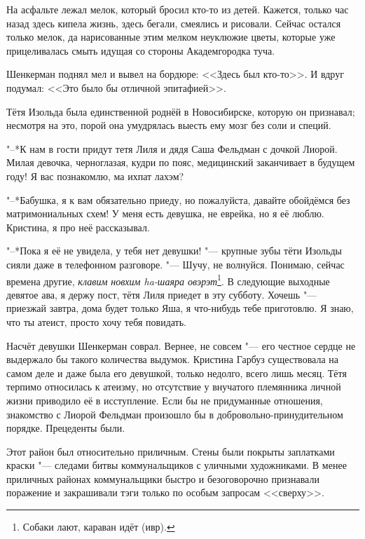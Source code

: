 На асфальте лежал мелок, который бросил кто-то из детей.
Кажется, только час назад здесь кипела жизнь, здесь бегали, смеялись и рисовали.
Сейчас остался только мелок, да нарисованные этим мелком неуклюжие цветы, которые уже прицеливалась смыть идущая со стороны Академгородка туча.

Шенкерман поднял мел и вывел на бордюре: <<Здесь был кто-то>>.
И вдруг подумал: <<Это было бы отличной эпитафией>>.

\asterism

\textspace

\label{Thu_2012_07_19}

Тётя Изольда была единственной роднёй в Новосибирске, которую он признавал;
несмотря на это, порой она умудрялась выесть ему мозг без соли и специй.

"--*К нам в гости придут тетя Лиля и дядя Саша Фельдман с дочкой Лиорой.
Милая девочка, черноглазая, кудри по пояс, медицинский заканчивает в будущем году!
Я вас познакомлю, ма ихпат лахэм?

"--*Бабушка, я к вам обязательно приеду, но пожалуйста, давайте обойдёмся без матримониальных схем!
У меня есть девушка, не еврейка, но я её люблю.
Кристина, я про неё рассказывал.

"--*Пока я её не увидела, у тебя нет девушки! "--- крупные зубы тёти Изольды сияли даже в телефонном разговоре.
"--- Шучу, не волнуйся.
Понимаю, сейчас времена другие, \textit{клавим новхим ha-шаяра овэрэт}\footnote{Собаки лают, караван идёт (ивр).}.
В следующие выходные девятое ава, я держу пост, тётя Лиля приедет в эту субботу.
Хочешь "--- приезжай завтра, дома будет только Яша, я что-нибудь тебе приготовлю.
Я знаю, что ты атеист, просто хочу тебя повидать.

Насчёт девушки Шенкерман соврал.
Вернее, не совсем "--- его честное сердце не выдержало бы такого количества выдумок.
Кристина Гарбуз существовала на самом деле и даже была его девушкой, только недолго, всего лишь месяц.
Тётя терпимо относилась к атеизму, но отсутствие у внучатого племянника личной жизни приводило её в исступление.
Если бы не придуманные отношения, знакомство с Лиорой Фельдман произошло бы в добровольно-принудительном порядке.
Прецеденты были.

\asterism

\textspace

\label{Fri_2012_07_20}

Этот район был относительно приличным.
Стены были покрыты заплатками краски "--- следами битвы коммунальщиков с уличными художниками.
В менее приличных районах коммунальщики быстро и безоговорочно признавали поражение и закрашивали тэги только по особым запросам <<сверху>>.

